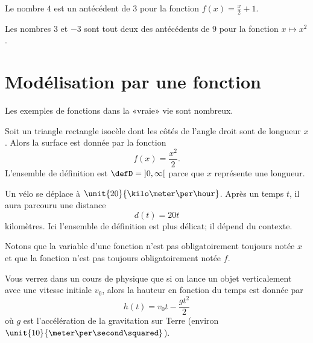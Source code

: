 \begin{example}
    Le nombre \( 4\) est un antécédent de \( 3\) pour la fonction \( f(x)=\frac{ x }{ 2 }+1\).
\end{example}

\begin{example}
    Les nombres \( 3\) et \( -3\) sont tout deux des antécédents de \( 9\) pour la fonction \( x\mapsto x^2\).
\end{example}

\section{Modélisation par une fonction}

Les exemples de fonctions dans la «vraie» vie sont nombreux.

\begin{example}
    Soit un triangle rectangle isocèle dont les côtés de l'angle droit sont de longueur \( x\). Alors la surface est donnée par la fonction
    \begin{equation}
        f(x)=\frac{ x^2 }{2}.
    \end{equation}
    L'ensemble de définition est \( \defD=\mathopen] 0 , \infty \mathclose[\) parce que \( x\) représente une longueur.
\end{example}

\begin{example}
    Un vélo se déplace à \( \unit{20}{\kilo\meter\per\hour}\). Après un temps \( t\), il aura parcouru une distance
    \begin{equation}
        d(t)=20t
    \end{equation}
    kilomètres. Ici l'ensemble de définition est plus délicat; il dépend du contexte.

    Notons que la variable d'une fonction n'est pas obligatoirement toujours notée \( x\) et que la fonction n'est pas toujours obligatoirement notée \( f\).
\end{example}

\begin{example}
    Vous verrez dans un cours de physique que si on lance un objet verticalement avec une vitesse initiale \( v_0\), alors la hauteur en fonction du temps est donnée par
    \begin{equation}
        h(t)=v_0t-\frac{ gt^2 }{2}
    \end{equation}
    où \( g\) est l'accélération de la gravitation sur Terre (environ \( \unit{10}{\meter\per\second\squared}\)).
\end{example}

